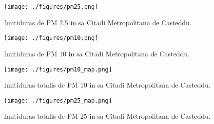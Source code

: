 \documentclass[a4paper]{article}
\begin{document}
\begin{figure}[tbp]
    \centering
    \texttt{[image: ./figures/pm25.png]}
    \caption{Imitiduras de PM 2.5 in sa Citadi Metropolitana de Casteddu.}
    \label{fig:pm25-prov-casteddu}
\end{figure}

\begin{figure}[tbp]
    \centering
    \texttt{[image: ./figures/pm10.png]}
    \caption{Imitiduras de PM 10 in sa Citadi Metropolitana de Casteddu.}
    \label{fig:pm10-prov-casteddu}
\end{figure}

\begin{figure}[tbp]
    \centering
    \texttt{[image: ./figures/pm10\_map.png]}
    \caption{Imitiduras totalis de PM 10 in sa Citadi Metropolitana de Casteddu.}
    \label{fig:pm10-prov-casteddu-map}
\end{figure}

\begin{figure}[tbp]
    \centering
    \texttt{[image: ./figures/pm25\_map.png]}
    \caption{Imitiduras totalis de PM 25 in sa Citadi Metropolitana de Casteddu.}
    \label{fig:pm25-prov-casteddu-map}
\end{figure}

\printbibliography
\end{document}
